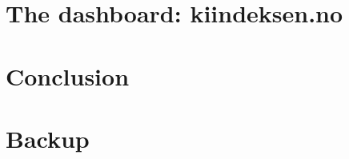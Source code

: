 \documentclass[aspectratio=169,11pt]{beamer}
\begin{document}
\section{The dashboard: kiindeksen.no}


\section{Conclusion}


\section*{Backup}


\end{document}
